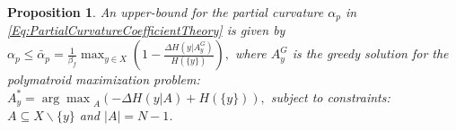 \documentclass[letterpaper, 10 pt, conference]{ieeeconf}
\newtheorem{proposition}{Proposition}
\begin{document}
\begin{proposition}\label{Pr:PartialCurvatureBound}
An upper-bound for the partial curvature $\alpha_p$ in \eqref{Eq:PartialCurvatureCoefficientTheory} is given by  
$
    \alpha_p \leq \bar{\alpha}_p = \frac{1}{\beta_f} \max_{y\in X} (1-\frac{\Delta H(y \vert A^G_y)}{H(\{y\})}),
$
where $A^G_y$ is the greedy solution for the polymatroid maximization problem: 
$    
A_y^* = {\arg\max}_{A} \left(-\Delta H(y \vert A)+H(\{y\})\right), 
$
subject to constraints: $A\subseteq X\backslash \{y\}$ and $\vert A \vert = N-1$.
\end{proposition}
\end{document}
